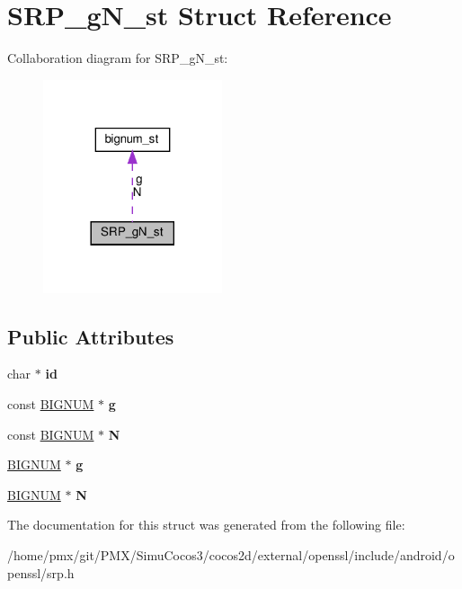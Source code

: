 \hypertarget{structSRP__gN__st}{}\section{S\+R\+P\+\_\+g\+N\+\_\+st Struct Reference}
\label{structSRP__gN__st}


Collaboration diagram for S\+R\+P\+\_\+g\+N\+\_\+st\+:
\nopagebreak
\begin{figure}[H]
\begin{center}
\leavevmode
\includegraphics[width=149pt]{structSRP__gN__st__coll__graph}
\end{center}
\end{figure}
\subsection*{Public Attributes}
\begin{DoxyCompactItemize}
\item 
\mbox{\label{structSRP__gN__st_a6b670b7b052b08bf62ff2eebd7078bcd}} 
char $\ast$ {\bfseries id}
\item 
\mbox{\label{structSRP__gN__st_a4fe01ecf5aa5d04b8652a20562129d10}} 
const \hyperlink{structbignum__st}{B\+I\+G\+N\+UM} $\ast$ {\bfseries g}
\item 
\mbox{\label{structSRP__gN__st_a9db83949c4e5942b1876234569302ce9}} 
const \hyperlink{structbignum__st}{B\+I\+G\+N\+UM} $\ast$ {\bfseries N}
\item 
\mbox{\label{structSRP__gN__st_a4527dc1f493a42d33e790a86775ee7d2}} 
\hyperlink{structbignum__st}{B\+I\+G\+N\+UM} $\ast$ {\bfseries g}
\item 
\mbox{\label{structSRP__gN__st_a4f8b9c2a5b4d2957f8a2d5702722d0ad}} 
\hyperlink{structbignum__st}{B\+I\+G\+N\+UM} $\ast$ {\bfseries N}
\end{DoxyCompactItemize}


The documentation for this struct was generated from the following file\+:\begin{DoxyCompactItemize}
\item 
/home/pmx/git/\+P\+M\+X/\+Simu\+Cocos3/cocos2d/external/openssl/include/android/openssl/srp.\+h\end{DoxyCompactItemize}
